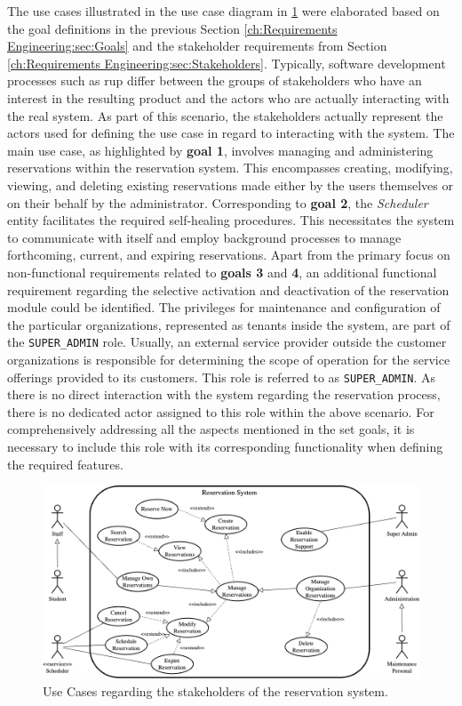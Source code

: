 The use cases illustrated in the use case diagram in \ref{fig:use-cases} were elaborated based on the goal definitions in the previous Section \ref{ch:Requirements Engineering:sec:Goals} and the stakeholder requirements from Section \ref{ch:Requirements Engineering:sec:Stakeholders}.
Typically, software development processes such as \acrshort{rup} \cite{kruchten_rational_1999} differ between the groups of stakeholders who have an interest in the resulting product and the actors who are actually interacting with the real system. 
As part of this scenario, the stakeholders actually represent the actors used for defining the use case in regard to interacting with the system.
The main use case, as highlighted by \textbf{goal 1}, involves managing and administering reservations within the reservation system. This encompasses creating, modifying, viewing, and deleting existing reservations made either by the users themselves or on their behalf by the administrator.
Corresponding to \textbf{goal 2}, the \textit{Scheduler} entity facilitates the required self-healing procedures. This necessitates the system to communicate with itself and employ background processes to manage forthcoming, current, and expiring reservations.
Apart from the primary focus on non-functional requirements related to \textbf{goals 3} and \textbf{4}, an additional functional requirement regarding the selective activation and deactivation of the reservation module could be identified.
The privileges for maintenance and configuration of the particular organizations, represented as tenants inside the system, are part of the \verb|SUPER_ADMIN| role.
Usually, an external service provider outside the customer organizations is responsible for determining the scope of operation for the service offerings provided to its customers. This role is referred to as \verb|SUPER_ADMIN|. As there is no direct interaction with the system regarding the reservation process, there is no dedicated actor assigned to this role within the above scenario.
For comprehensively addressing all the aspects mentioned in the set goals, it is necessary to include this role with its corresponding functionality when defining the required features.

\begin{figure}[h]
    \centering
    \includegraphics[scale=0.4]{resources/images/main/2_requirements_engineering/UseCases.png}
    \caption{Use Cases regarding the stakeholders of the reservation system.}
    \label{fig:use-cases}
\end{figure}
